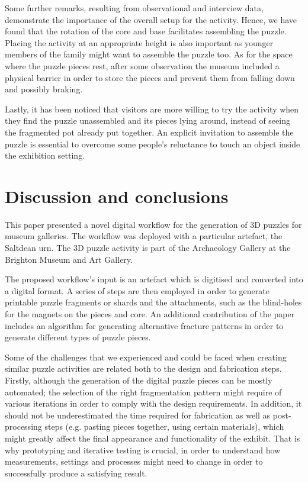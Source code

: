 \documentclass[acmlarge,screen,dvipsnames]{acmart}
\begin{document}
Some further remarks, resulting from observational and interview data,
demonstrate the importance of the overall setup for the activity. 
Hence, we have found that the rotation of the core and base
facilitates assembling the puzzle. Placing
the activity at an appropriate height is also important as younger
members of the family might want to assemble the puzzle too.  
As for the space where the puzzle pieces rest, after some observation
the museum included a physical barrier in order to store the
pieces and prevent them from falling down and possibly braking. 


Lastly, it has been noticed that
visitors are more willing to try the activity when they find the
puzzle unassembled and its pieces lying around, instead of seeing the
fragmented pot already put together. An explicit invitation to
assemble the puzzle is essential to overcome some people’s reluctance
to touch an object inside the exhibition setting. 







\section{Discussion and conclusions}
\label{conclusions}

This paper presented a novel digital workflow for the generation of 3D
puzzles for museum galleries. The workflow was deployed with a
particular artefact, the Saltdean urn. The 3D puzzle activity is part
of the Archaeology Gallery at the Brighton Museum and Art Gallery.

The proposed workflow's input is an artefact which is digitised and
converted into a digital format. A series of steps are then employed
in order to generate printable puzzle fragments or shards and the
attachments, such as the blind-holes for the magnets on the pieces and
core. An additional contribution of the paper includes an algorithm
for generating alternative fracture patterns in order to generate
different types of puzzle pieces.

Some of the challenges that we experienced and could be faced when
creating similar puzzle activities are related both to the design and
fabrication steps. Firstly, although the generation of the digital
puzzle pieces can be mostly automated; the selection of the right
fragmentation pattern might require of various iterations in order to
comply with the design requirements. In addition, it should not be
underestimated the time required for fabrication as well as
post-processing steps (e.g. pasting pieces together, using certain
materials), which might greatly affect the final appearance and
functionality of the exhibit. That is why prototyping and iterative
testing is crucial, in order to understand how measurements, settings
and processes might need to change in order to successfully produce a
satisfying result.
\end{document}
